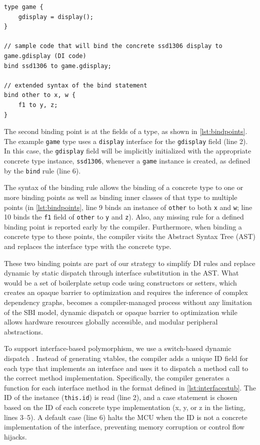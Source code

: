 \documentclass[10pt,sigplan,screen,anonymous]{acmart}
\begin{document}
\begin{lstlisting}[float=tp, caption=Binding points in the prototype language., label=lst:bindpoints]
type game {
    gdisplay = display();
}

// sample code that will bind the concrete ssd1306 display to game.gdisplay (DI code)
bind ssd1306 to game.gdisplay;

// extended syntax of the bind statement
bind other to x, w {
    f1 to y, z;
}
\end{lstlisting}

The second binding point is at the fields of a type, as shown in \autoref{lst:bindpoints}. The example {\tt game} type uses a {\tt display} interface for the {\tt gdisplay} field (line 2). In this case, the {\tt gdisplay} field will be implicitly initialized with the appropriate concrete type instance, {\tt ssd1306}, whenever a {\tt game} instance is created, as defined by the {\tt bind} rule (line 6). 

The syntax of the binding rule allows the binding of a concrete type to one or more binding points as well as binding inner classes of that type to multiple points (in \autoref{lst:bindpoints}, line 9 binds an instance of {\tt other} to both {\tt x} and {\tt w}; line 10 binds the {\tt f1} field of {\tt other} to {\tt y} and {\tt z}). Also, any missing rule for a defined binding point is reported early by the compiler. Furthermore, when binding a concrete type to these points, the compiler visits the Abstract Syntax Tree (AST) and replaces the interface type with the concrete type.

These two binding points are part of our strategy to simplify DI rules and replace dynamic by static dispatch through interface substitution in the AST. What would be a set of boilerplate setup code using constructors or setters, which creates an opaque barrier to optimization and requires the inference of complex dependency graphs, becomes a compiler-managed process without any limitation of the SBI model, dynamic dispatch or opaque barrier to optimization while allows hardware resources globally accessible, and modular peripheral abstractions.

To support interface-based polymorphism, we use a switch-based dynamic dispatch \cite{bauer2021novt}. Instead of generating vtables, the compiler adds a unique ID field for each type that implements an interface and uses it to dispatch a method call to the correct method implementation. Specifically, the compiler generates a function for each interface method in the format defined in \autoref{lst:interfacestub}. The ID of the instance ({\tt this.id}) is read (line 2), and a case statement is chosen based on the ID of each concrete type implementation (x, y, or z in the listing, lines 3--5). A default case (line 6) halts the MCU when the ID is not a concrete implementation of the interface, preventing memory corruption or control flow hijacks.
\end{document}
